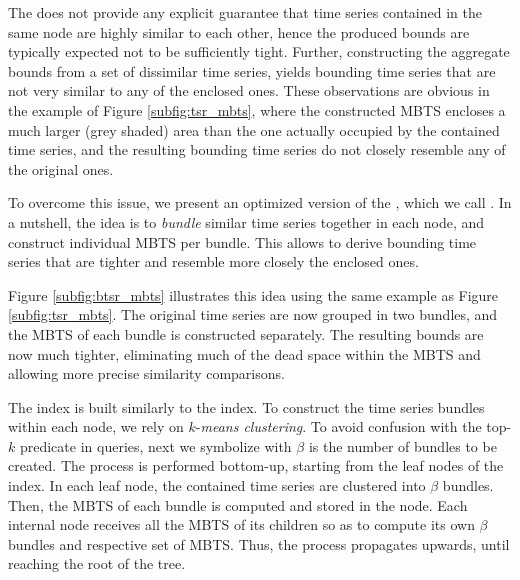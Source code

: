 The \tsr does not provide any explicit guarantee that time series contained in the same node are highly similar to each other, hence the produced bounds are typically expected not to be sufficiently tight. Further, constructing the aggregate bounds from a set of dissimilar time series, yields bounding time series that are not very similar to any of the enclosed ones. These observations are obvious in the example of Figure \ref{subfig:tsr_mbts}, where the constructed MBTS encloses a much larger (grey shaded) area than the one actually occupied by the contained time series, and the resulting bounding time series do not closely resemble any of the original ones.

To overcome this issue, we present an optimized version of the \tsr, which we call \btsr. In a nutshell, the idea is to \emph{bundle} similar time series together in each node, and construct individual MBTS per bundle. This allows to derive bounding time series that are tighter and resemble more closely the enclosed ones. 

\begin{myexample}
 Figure \ref{subfig:btsr_mbts} illustrates this idea using the same example as Figure \ref{subfig:tsr_mbts}. The original time series are now grouped in two bundles, and the MBTS of each bundle is constructed separately. The resulting bounds are now much tighter, eliminating much of the dead space within the MBTS and allowing more precise similarity comparisons.
\end{myexample}

The \btsr index is built similarly to the \tsr index. To construct the time series bundles within each node, we rely on $k$-{\em means clustering}. To avoid confusion with the top-$k$ predicate in queries, next we symbolize with $\beta$ is the number of bundles to be created. The process is performed bottom-up, starting from the leaf nodes of the index. In each leaf node, the contained time series are clustered into $\beta$ bundles. Then, the MBTS of each bundle is computed and stored in the node. Each internal node receives all the MBTS of its children so as to compute its own $\beta$ bundles and respective set of MBTS. Thus, the process propagates upwards, until reaching the root of the tree.

